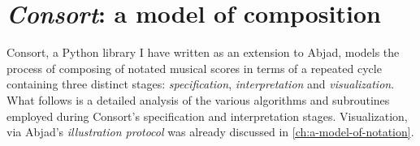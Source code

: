 \chapter{\emph{Consort}: a model of composition}
\label{chap:a-model-of-composition}



\begin{comment}
<abjad>[hide=true]
import collections
import consort
</abjad>
\end{comment}

\begin{comment}
\begin{markdown}
-   Materials
-   Configuration
-   Templating
-   Layers
-   Coarse to fine
-   Rhythm first
-   What is specification? What is a specifier? What is configuration and
    aggregation?
-   What should happen musically, where should it happen?
-   What is material?
-   What is music?
-   Rhythm is interpreted first, as all other parameters depend on it.
-   Rhythm is interpreted from "coarse" to "fine": from the level of phrase
    boundaries to the level of individual notes, rests, tuplets and ties.
-   This discussion only focuses on notation, nothing related to aesthetic
    experience, physical modeling or anything else. This is a tool for a
    specific composer to create scores, not a discussion explicitly of why they
    would work this way (although that should be discussed in the conclusion).
-   Specification and interpretation conceive of the score as a single, hugely
    complex expression.
-   Templating as variation.
-   Define what composition means here: laying out symbols on the page.
-   This way of thinking and working does not attempt to define or even model
    concepts like "melody" or even "phrase". They're too vague. If we use that
    terminology at all, it is only in the most incredibly constrained way.
\end{markdown}
\end{comment}

Consort, a Python library I have written as an extension to Abjad, models the
process of composing of notated musical scores in terms of a repeated cycle
containing three distinct stages: \emph{specification}, \emph{interpretation}
and \emph{visualization}. What follows is a detailed analysis of the various
algorithms and subroutines employed during Consort's specification and
interpretation stages. Visualization, via Abjad's \emph{illustration protocol}
was already discussed in \autoref{ch:a-model-of-notation}.

